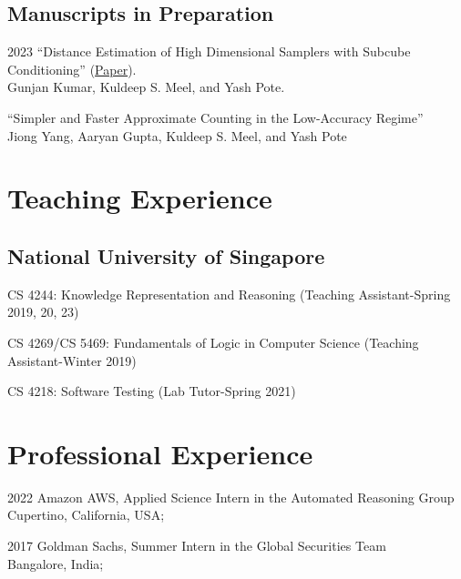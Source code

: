 \documentclass[12pt,letterpaper]{report}
\newcommand{\listitemspace}{0.15em}
\renewenvironment{itemize}
{\begin{list}{}{\setlength{\leftmargin}{0em}
			\setlength{\parskip}{0em}
			\setlength{\itemsep}{\listitemspace}
			\setlength{\parsep}{\listitemspace}}}
	{\end{list}}
\begin{document}
	\subsection*{Manuscripts in Preparation}
	
	\begin{tablist}
		\item[2023] \tab  	\enquote{Distance Estimation of High Dimensional Samplers with Subcube Conditioning} (\href{https://arxiv.org/abs/2308.04264}{Paper}).\\
		Gunjan Kumar,  Kuldeep S. Meel, and Yash Pote.
		
		\item[\the\year] \tab  	\enquote{Simpler and Faster Approximate Counting in the Low-Accuracy Regime}\\
		Jiong Yang, Aaryan Gupta, Kuldeep S. Meel,  and Yash Pote
	\end{tablist}
	
	
	\section*{Teaching Experience}
	
	\subsection*{National University of Singapore}
	
	\begin{itemize}
		
		\item   CS 4244: Knowledge Representation and Reasoning (Teaching Assistant-Spring 2019, 20, 23)
		\item   CS 4269/CS 5469: Fundamentals of Logic in Computer Science (Teaching Assistant-Winter 2019)
		\item   CS 4218: Software Testing (Lab Tutor-Spring 2021)
		
	\end{itemize}
	
	\section*{Professional Experience}
	\begin{tablist}
		\item[2022] \tab Amazon AWS, Applied Science Intern in the Automated Reasoning Group\\
		Cupertino, California, USA;
	\end{tablist}
	\begin{tablist}
		\item[2017] \tab Goldman Sachs, Summer Intern in the Global Securities Team\\
		Bangalore, India;
	\end{tablist}
	
\end{document}
